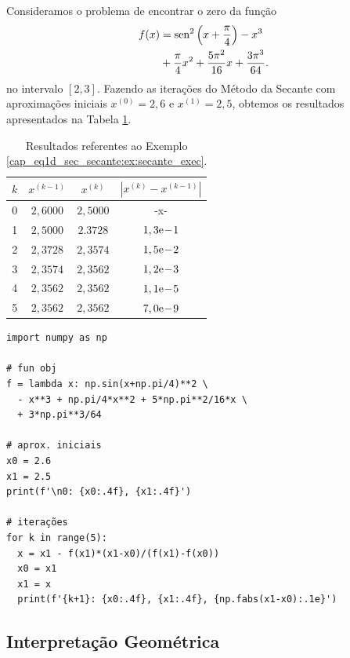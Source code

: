 \begin{ex}\label{ex:secante_exec}
  Consideramos o problema de encontrar o zero da função
  \begin{equation}
    \begin{aligned}
      f(x) &= \operatorname{sen}^2\left(x+\frac{\pi}{4}\right) - x^3 \\
      &+ \frac{\pi}{4}x^2 + \frac{5\pi^2}{16}x + \frac{3\pi^3}{64}.
    \end{aligned}
  \end{equation}
  no intervalo $[2,3]$. Fazendo as iterações do Método da Secante com aproximações iniciais $x^{(0)}=2,6$ e $x^{(1)}=2,5$, obtemos os resultados apresentados na Tabela \ref{cap_eq1d_sec_secante:tab:ex_secante_exec}.

\begin{table}[h!]
  \centering
  \caption{Resultados referentes ao Exemplo \ref{cap_eq1d_sec_secante:ex:secante_exec}.}
  \label{cap_eq1d_sec_secante:tab:ex_secante_exec}
  \begin{tabular}{r|ccc}
    $k$ & $x^{(k-1)}$ & $x^{(k)}$ & $|x^{(k)}-x^{(k-1)}|$ \\\hline
    0 & $2,6000$ & $2,5000$ & -x-\\
    1 & $2,5000$ & $2.3728$ & $1,3\mathrm{e}\!-\!1$ \\
    2 & $2,3728$ & $2,3574$ & $1,5\mathrm{e}\!-\!2$ \\
    3 & $2,3574$ & $2,3562$ & $1,2\mathrm{e}\!-\!3$ \\
    4 & $2,3562$ & $2,3562$ & $1,1\mathrm{e}\!-\!5$ \\
    5 & $2,3562$ & $2,3562$ & $7,0\mathrm{e}\!-\!9$ \\\hline
  \end{tabular}
\end{table}

\begin{lstlisting}
import numpy as np

# fun obj
f = lambda x: np.sin(x+np.pi/4)**2 \
  - x**3 + np.pi/4*x**2 + 5*np.pi**2/16*x \
  + 3*np.pi**3/64

# aprox. iniciais
x0 = 2.6
x1 = 2.5
print(f'\n0: {x0:.4f}, {x1:.4f}')

# iterações
for k in range(5):
  x = x1 - f(x1)*(x1-x0)/(f(x1)-f(x0))
  x0 = x1
  x1 = x
  print(f'{k+1}: {x0:.4f}, {x1:.4f}, {np.fabs(x1-x0):.1e}')
\end{lstlisting}

\end{ex}

\subsection{Interpretação Geométrica}

